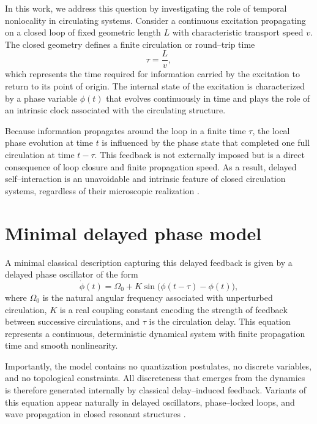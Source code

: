 \documentclass[11pt]{article}
\begin{document}
        In this work, we address this question by investigating the role of temporal nonlocality in circulating systems. Consider a continuous excitation propagating on a closed loop of fixed geometric length $L$ with characteristic transport speed $v$. The closed geometry defines a finite circulation or round--trip time
        \begin{equation}
            \tau = \frac{L}{v},
            \label{eq:tau}
        \end{equation}
        which represents the time required for information carried by the excitation to return to its point of origin. The internal state of the excitation is characterized by a phase variable $\phi(t)$ that evolves continuously in time and plays the role of an intrinsic clock associated with the circulating structure.

        Because information propagates around the loop in a finite time $\tau$, the local phase evolution at time $t$ is influenced by the phase state that completed one full circulation at time $t-\tau$. This feedback is not externally imposed but is a direct consequence of loop closure and finite propagation speed. As a result, delayed self--interaction is an unavoidable and intrinsic feature of closed circulation systems, regardless of their microscopic realization \cite{Hale1993,Diekmann1995,Erneux2009}.

    \section{Minimal delayed phase model}
        A minimal classical description capturing this delayed feedback is given by a delayed phase oscillator of the form
        \begin{equation}
            \dot{\phi}(t) = \Omega_0 + K \sin\big(\phi(t-\tau) - \phi(t)\big),
            \label{eq:delayed_oscillator}
        \end{equation}
        where $\Omega_0$ is the natural angular frequency associated with unperturbed circulation, $K$ is a real coupling constant encoding the strength of feedback between successive circulations, and $\tau$ is the circulation delay. This equation represents a continuous, deterministic dynamical system with finite propagation time and smooth nonlinearity.

        Importantly, the model contains no quantization postulates, no discrete variables, and no topological constraints. All discreteness that emerges from the dynamics is therefore generated internally by classical delay--induced feedback. Variants of this equation appear naturally in delayed oscillators, phase--locked loops, and wave propagation in closed resonant structures \cite{Erneux2009,Earl2003,Gardner2005,Ikeda1979}.
\end{document}
